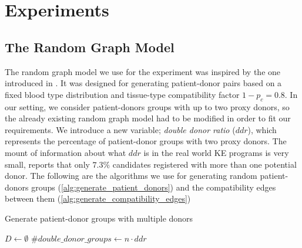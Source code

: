\chapter{Experiments}
\label{cha:Experiments}


\section{The Random Graph Model}
The random graph model we use for the experiment was inspired by the one introduced in \cite{toulis2011random}. It was designed for generating patient-donor pairs based on a fixed blood type distribution and tissue-type compatibility factor $1 - p_c = 0.8$. In our setting, we consider patient-donors groups with up to two proxy donors, so the already existing random graph model had to be modified in order to fit our requirements. We introduce a new variable; \textit{double donor ratio} ($ddr$), which represents the percentage of patient-donor groups with two proxy donors. The mount of information about what $ddr$ is in the real world \ac{KE} programs is very small, \cite{holscher2018kidney} reports that only $7.3\%$ candidates registered with more than one potential donor. The following are the algorithms we use for generating random patient-donors groups (\autoref{alg:generate_patient_donors}) and the compatibility edges between them (\autoref{alg:generate_compatibility_edges})

\begin{algorithm}
    \caption{Generate patient-donor groups with multiple donors}
    \label{alg:generate_patient_donors}


    $D \gets \emptyset$\;
    $\#double\_donor\_groups \gets n \cdot ddr$\;
\end{algorithm}


